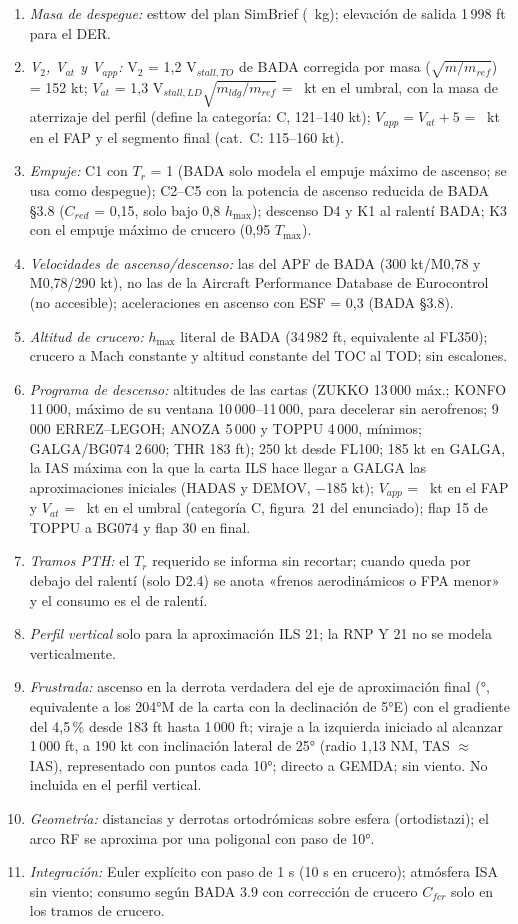 \documentclass[11pt,a4paper]{article}
\DeclareRobustCommand{\m}[1]{{\ttfamily\def\_{\textunderscore\penalty100\relax}#1}}
\begin{document}
\begin{enumerate}
\item \emph{Masa de despegue:} \m{est\_tow} del plan SimBrief (\sbTOW~kg); elevación de salida 1\,998 ft para el DER.
\item \emph{V$_2$, V$_{at}$ y V$_{app}$:} V$_2$ = 1,2 V$_{stall,TO}$ de BADA corregida por masa ($\sqrt{m/m_{ref}}$) = 152 kt; $V_{at}$ = 1,3 V$_{stall,LD}\sqrt{m_{ldg}/m_{ref}}$ = \vVref~kt en el umbral, con la masa de aterrizaje del perfil (define la categoría: C, 121--140 kt); $V_{app} = V_{at}+5$ = \vVfap~kt en el FAP y el segmento final (cat.~C: 115--160 kt).
\item \emph{Empuje:} C1 con $T_r$ = 1 (BADA solo modela el empuje máximo de ascenso; se usa como despegue); C2--C5 con la potencia de ascenso reducida de BADA §3.8 ($C_{red}$ = 0,15, solo bajo 0,8 $h_{\max}$); descenso D4 y K1 al ralentí BADA; K3 con el empuje máximo de crucero (0,95 $T_{\max}$).
\item \emph{Velocidades de ascenso/descenso:} las del APF de BADA (300 kt/M0,78 y M0,78/290 kt), no las de la Aircraft Performance Database de Eurocontrol (no accesible); aceleraciones en ascenso con ESF = 0,3 (BADA §3.8).
\item \emph{Altitud de crucero:} $h_{\max}$ literal de BADA (34\,982 ft, equivalente al FL350); crucero a Mach constante y altitud constante del TOC al TOD; sin escalones.
\item \emph{Programa de descenso:} altitudes de las cartas (ZUKKO 13\,000 máx.; KONFO 11\,000, máximo de su ventana 10\,000--11\,000, para decelerar sin aerofrenos; 9\,000 ERREZ--LEGOH; ANOZA 5\,000 y TOPPU 4\,000, mínimos; GALGA/BG074 2\,600; THR 183 ft); 250 kt desde FL100; 185 kt en GALGA, la IAS máxima con la que la carta ILS hace llegar a GALGA las aproximaciones iniciales (HADAS y DEMOV, $-$185 kt); $V_{app}$ = \vVfap~kt en el FAP y $V_{at}$ = \vVref~kt en el umbral (categoría C, figura~21 del enunciado); flap 15 de TOPPU a BG074 y flap 30 en final.
\item \emph{Tramos PTH:} el $T_r$ requerido se informa sin recortar; cuando queda por debajo del ralentí (solo D2.4) se anota «frenos aerodinámicos o FPA menor» y el consumo es el de ralentí.
\item \emph{Perfil vertical} solo para la aproximación ILS 21; la RNP Y 21 no se modela verticalmente.
\item \emph{Frustrada:} ascenso en la derrota verdadera del eje de aproximación final (\misCAtrk°, equivalente a los 204°M de la carta con la declinación de 5°E) con el gradiente del 4,5\,\% desde 183 ft hasta 1\,000 ft; viraje a la izquierda iniciado al alcanzar 1\,000 ft, a 190 kt con inclinación lateral de 25° (radio 1,13 NM, TAS $\approx$ IAS), representado con puntos cada 10°; directo a GEMDA; sin viento. No incluida en el perfil vertical.
\item \emph{Geometría:} distancias y derrotas ortodrómicas sobre esfera (\m{orto\_distazi}); el arco RF se aproxima por una poligonal con paso de 10°.
\item \emph{Integración:} Euler explícito con paso de 1 s (10 s en crucero); atmósfera ISA sin viento; consumo según BADA 3.9 con corrección de crucero $C_{fcr}$ solo en los tramos de crucero.
\end{enumerate}
\end{document}
